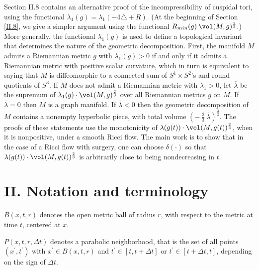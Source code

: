 Section II.8 contains an alternative proof of the incompressibility
of cuspidal tori, using the functional $\lambda_1(g) =
\lambda_1(-4 \triangle + R)$.
(At the beginning of Section \ref{II.8}, we give a simpler argument
using the functional $R_{min}(g) \: \vol(M,g)^{\frac23}$.)
More generally, the functional $\lambda_1(g)$ is
used to define a topological invariant that determines the nature
of the geometric decomposition. First, the manifold $M$ admits a
Riemannian metric $g$ with $\lambda_1(g) > 0$ if and only if it
admits a Riemannian metric with positive scalar curvature, which
in turn is equivalent to saying that $M$ is diffeomorphic to a
connected sum of $S^1 \times S^2$'s and round quotients of
$S^3$. If $M$ does not admit a Riemannian metric with
$\lambda_1 > 0$, let $\overline{\lambda}$ be the supremum of
$\lambda_1(g) \cdot \vol(M, g)^{\frac23}$ over all Riemannian metrics $g$
on $M$. If $\overline{\lambda} = 0$ then $M$ is a graph manifold.
If $\overline{\lambda} < 0$ then the geometric decomposition of $M$
contains a nonempty hyperbolic piece, with total volume
$\left( - \: \frac23 \: \overline{\lambda} \right)^{\frac32}$. The proofs
of these statements use the monotonicity of
$\lambda(g(t)) \cdot \vol(M, g(t))^{\frac23}$, when it is nonpositive,
under a smooth Ricci flow. The main work is to show
that in the case of a Ricci flow with surgery, one can choose $\delta(\cdot)$
so that $\lambda(g(t)) \cdot \vol(M, g(t))^{\frac23}$ is
arbitrarily close to being nondecreasing in $t$.

\section{II. Notation and terminology}
\label{notationterminology}

$B(x,t,r)$ denotes the open metric ball of radius $r$, with respect to the metric
at time $t$, centered at $x$.

$P(x,t,r, \Delta t)$ denotes a parabolic neighborhood, that is the set of
all points $(x^\prime, t^\prime)$ with $x^\prime \in B(x,t,r)$ and
$t^\prime \in [t, t+\Delta t]$ or $t^\prime \in [t+\Delta t, t]$, depending on
the sign of $\Delta t$.

